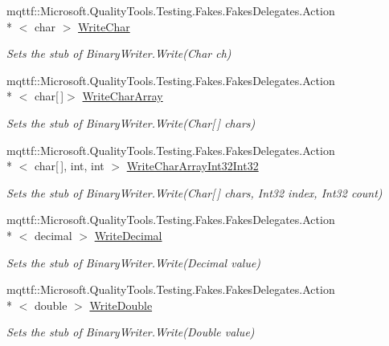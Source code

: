 \begin{DoxyCompactItemize}
mqttf\-::\-Microsoft.\-Quality\-Tools.\-Testing.\-Fakes.\-Fakes\-Delegates.\-Action\\*
$<$ char $>$ \hyperlink{class_system_1_1_i_o_1_1_fakes_1_1_stub_binary_writer_ac019f0cb3791f9107fcf800ea7a8490e}{Write\-Char}
\begin{DoxyCompactList}\small\item\em Sets the stub of Binary\-Writer.\-Write(\-Char ch)\end{DoxyCompactList}\item 
mqttf\-::\-Microsoft.\-Quality\-Tools.\-Testing.\-Fakes.\-Fakes\-Delegates.\-Action\\*
$<$ char\mbox{[}$\,$\mbox{]}$>$ \hyperlink{class_system_1_1_i_o_1_1_fakes_1_1_stub_binary_writer_ab3af2483b57ca9a570b046ae9cc64ca0}{Write\-Char\-Array}
\begin{DoxyCompactList}\small\item\em Sets the stub of Binary\-Writer.\-Write(\-Char\mbox{[}$\,$\mbox{]} chars)\end{DoxyCompactList}\item 
mqttf\-::\-Microsoft.\-Quality\-Tools.\-Testing.\-Fakes.\-Fakes\-Delegates.\-Action\\*
$<$ char\mbox{[}$\,$\mbox{]}, int, int $>$ \hyperlink{class_system_1_1_i_o_1_1_fakes_1_1_stub_binary_writer_a4b01ceacc4ee0b37624d6de2613583f7}{Write\-Char\-Array\-Int32\-Int32}
\begin{DoxyCompactList}\small\item\em Sets the stub of Binary\-Writer.\-Write(\-Char\mbox{[}$\,$\mbox{]} chars, Int32 index, Int32 count)\end{DoxyCompactList}\item 
mqttf\-::\-Microsoft.\-Quality\-Tools.\-Testing.\-Fakes.\-Fakes\-Delegates.\-Action\\*
$<$ decimal $>$ \hyperlink{class_system_1_1_i_o_1_1_fakes_1_1_stub_binary_writer_ad7c76d4a6afb9d81bafa5403e6bcf5dc}{Write\-Decimal}
\begin{DoxyCompactList}\small\item\em Sets the stub of Binary\-Writer.\-Write(\-Decimal value)\end{DoxyCompactList}\item 
mqttf\-::\-Microsoft.\-Quality\-Tools.\-Testing.\-Fakes.\-Fakes\-Delegates.\-Action\\*
$<$ double $>$ \hyperlink{class_system_1_1_i_o_1_1_fakes_1_1_stub_binary_writer_afdb35fb5d007a2000c8ec5fe9bb9eecb}{Write\-Double}
\begin{DoxyCompactList}\small\item\em Sets the stub of Binary\-Writer.\-Write(\-Double value)\end{DoxyCompactList}\item 

\end{DoxyCompactItemize}
